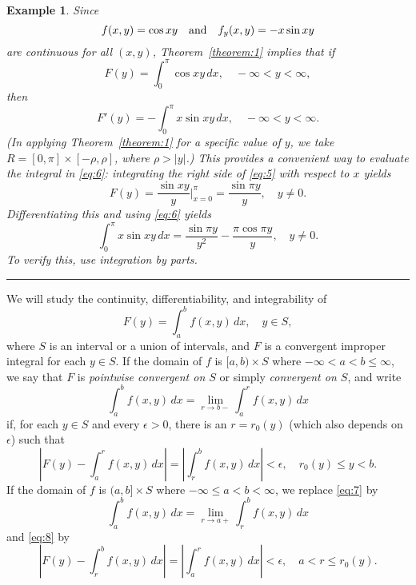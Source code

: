 \documentclass{article}
\newtheorem{example}{Example}
\newcommand{\bbox}{\phantom{1}\hfill{\rule{6pt}{6pt}}}
\begin{document}
\begin{example}  \label{example:1}  \rm
Since
$$
f(x,y)=\cos xy\text{\quad and\quad} f_{y}(x,y)=-x\sin xy
$$
are continuous for all $(x,y)$,
Theorem~\ref{theorem:1} implies that if
\begin{equation} \label{eq:5}
F(y)=\int_{0}^{\pi} \cos xy\,dx,\quad -\infty<y<\infty,
\end{equation}
then
\begin{equation} \label{eq:6}
F'(y)=-\int_{0}^{\pi}x\sin xy\,dx,\quad -\infty<y<\infty.
\end{equation}
(In applying Theorem~\ref{theorem:1} for a specific value
of $y$, we take
$R=[0,\pi]\times [-\rho,\rho]$, where $\rho>|y|$.)  This provides a
convenient way to evaluate the integral in \eqref{eq:6}:
integrating the right side of  \eqref{eq:5} with respect to $x$ yields
$$
F(y)=\frac{\sin xy}{y}\bigg|_{x=0}^{\pi}=\frac{\sin\pi y}{y}, \quad
y\ne0.
$$
Differentiating this and using \eqref{eq:6}  yields
$$
\int_{0}^{\pi}x\sin xy\,dx =\frac{\sin \pi y}{y^{2}}-
\frac{\pi\cos \pi y}{y}, \quad y\ne0.
$$
To verify this, use integration by parts. \bbox
\end{example}



We will study the continuity,
differentiability, and integrability of
$$
F(y)=\int_{a}^{b}f(x,y)\,dx,\quad  y\in S,
$$
where $S$ is an interval or a union of intervals,
and $F$ is a convergent improper integral for each $y\in S$.
If the domain of $f$ is $[a,b)\times S$  where
$-\infty<a< b\le \infty$,
we say that $F$ is \emph{pointwise  convergent on $S$} or simply
\emph{convergent on $S$},  and write
\begin{equation} \label{eq:7}
\int_{a}^{b}f(x,y)\,dx=\lim_{r\to b-}\int_{a}^{r}f(x,y)\,dx
\end{equation}
  if,
 for each $y\in S$  and every
$\epsilon>0$,  there is an $r=r_{0}(y)$ (which also depends on $\epsilon$)
such that
\begin{equation} \label{eq:8}
\left|F(y)-\int_{a}^{r}f(x,y)\,dx\right|=
\left|\int_{r}^{b}f(x,y)\,dx\right|< \epsilon,
\quad  r_{0}(y)\le y<b.
\end{equation}
If the domain of $f$  is $(a,b]\times S$ where $-\infty\le a<b<\infty$,
  we replace  \eqref{eq:7} by
$$
\int_{a}^{b}f(x,y)\,dx=\lim_{r\to a+}\int_{r}^{b}f(x,y)\,dx
$$
and \eqref{eq:8} by
$$
\left|F(y)-\int_{r}^{b}f(x,y)\,dx\right|=
\left|\int_{a}^{r}f(x,y)\,dx\right|< \epsilon,
\quad a<r\le  r_{0}(y).
$$
\end{document}
